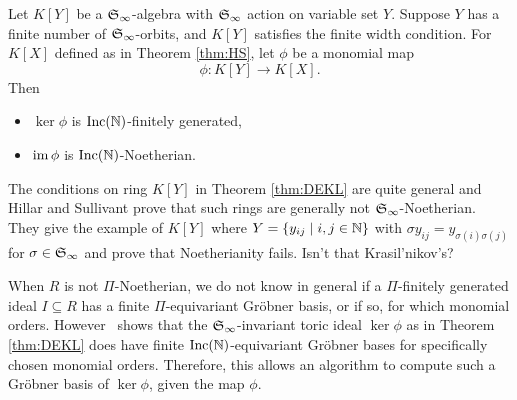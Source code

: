 \begin{theorem}\label{thm:DEKL}
 Let $K[Y]$ be a $\mathfrak S_\infty$-algebra with $\mathfrak S_\infty$ action on variable set $Y$.  Suppose $Y$ has a finite number of $\mathfrak S_\infty$-orbits, and $K[Y]$ satisfies the finite width condition.  For $K[X]$ defined as in Theorem \ref{thm:HS}, let $\phi$ be a monomial map
  \[ \phi: K[Y] \to K[X]. \]
 Then
 \begin{itemize}
  \item $\ker \phi$ is $\operatorname{Inc}(\mathbb N)$-finitely generated,
  \item $\operatorname{im} \phi$ is $\operatorname{Inc}(\mathbb N)$-Noetherian.
 \end{itemize}
\end{theorem}

The conditions on ring $K[Y]$ in Theorem \ref{thm:DEKL} are quite general and Hillar and Sullivant \cite{hillar2012finite} prove that such rings are generally not $\mathfrak S_\infty$-Noetherian.  They give the example of $K[Y]$ where $Y = \{y_{ij} \mid i, j \in \mathbb N\}$ with $\sigma y_{ij} = y_{\sigma(i)\sigma(j)}$ for $\sigma \in \mathfrak S_\infty$ and prove that Noetherianity fails. {\color{red} Isn't that Krasil'nikov's?}

When $R$ is not $\Pi$-Noetherian, we do not know in general if a $\Pi$-finitely generated ideal $I\subseteq R$ has a finite $\Pi$-equivariant Gr\"obner basis, or if so, for which monomial orders.  However~\cite{Krone:egb-toric} shows that the $\mathfrak S_\infty$-invariant toric ideal $\ker \phi$ as in Theorem \ref{thm:DEKL} does have finite $\operatorname{Inc}(\mathbb N)$-equivariant Gr\"obner bases for specifically chosen monomial orders.  Therefore, this allows an algorithm to compute such a Gr\"obner basis of $\ker \phi$, given the map $\phi$.
